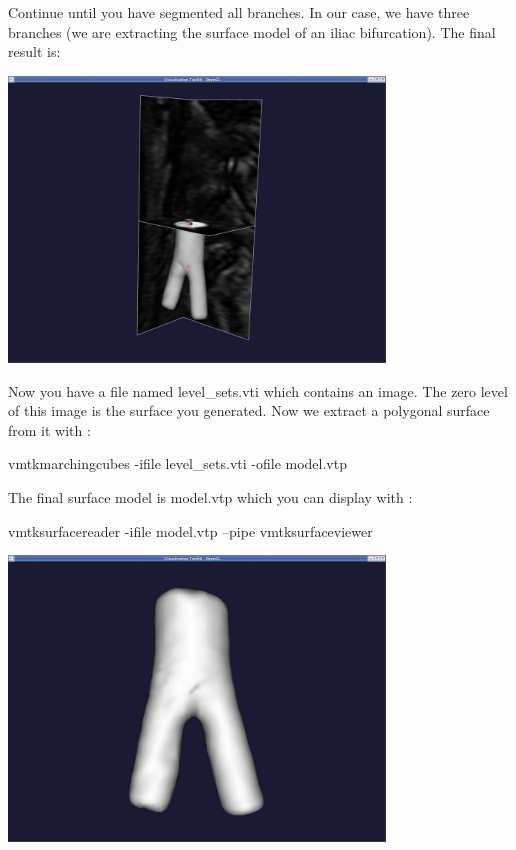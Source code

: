 Continue until you have segmented all branches. In our case, we have three branches (we are extracting the surface model of an iliac bifurcation). The final result is\+:

 
\begin{DoxyImageNoCaption}
  \mbox{\includegraphics[width=0.75\textwidth]{merge_branches2}}
\end{DoxyImageNoCaption}


Now you have a file named {\ttfamily level\+\_\+sets.\+vti} which contains an image. The zero level of this image is the surface you generated. Now we extract a polygonal surface from it with \+: 
\begin{DoxyCode}
vmtkmarchingcubes -ifile level\_sets.vti -ofile model.vtp
\end{DoxyCode}


The final surface model is {\ttfamily model.\+vtp} which you can display with \+: 
\begin{DoxyCode}
vmtksurfacereader -ifile model.vtp --pipe vmtksurfaceviewer
\end{DoxyCode}


 
\begin{DoxyImageNoCaption}
  \mbox{\includegraphics[width=0.75\textwidth]{surfaceviewer1}}
\end{DoxyImageNoCaption}


